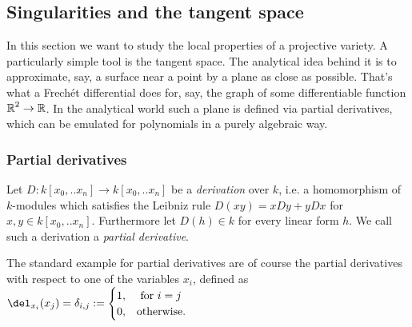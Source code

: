 \subsection{Singularities and the tangent space}

In this section we want to study the local properties of a projective variety.
A particularly simple tool is the tangent space.
The analytical idea behind it is to approximate, say, a surface near a point by a plane as close as possible.
That's what a Frechét differential does for, say,  the graph of some differentiable function $\operatorname{\mathbb R}^2 \to \operatorname{\mathbb R}$.
In the analytical world such a plane is defined via partial derivatives, which can be emulated for polynomials in a purely algebraic way.

\subsubsection{Partial derivatives}
\begin{definition}
Let $D : k[x_0,..x_n] \to k[x_0,..x_n]$ be a \emph{derivation} over $k$, i.e. a homomorphism of $k$-modules which satisfies the Leibniz rule $D(xy) = xDy+yDx$ for $x,y \in k[x_0,..x_n]$. Furthermore let $D(h) \in k$ for every linear form $h$. We call such a derivation a \emph{partial derivative}.
\end{definition}

\begin{example}
The standard example for partial derivatives are of course the partial derivatives with respect to one of the variables $x_i$, defined as $\del_{x_i}(x_j) = \delta_{i,j} := \begin{cases} 1, & \text{ for } i = j \\ 0, & \text {otherwise.} \end{cases}$
\end{example}

